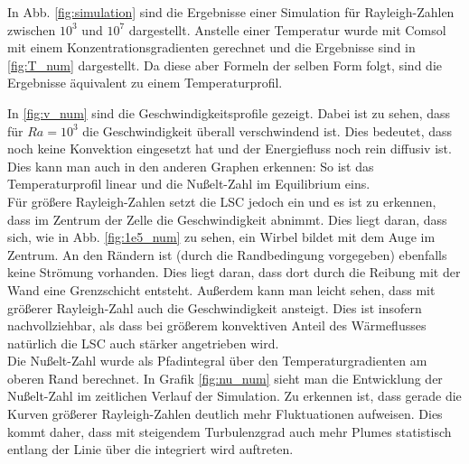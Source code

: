 \documentclass[12pt,a4paper,titlepage,headinclude]{scrartcl}
\numberwithin{equation}{subsection}
\begin{document}
In Abb. \ref{fig:simulation} sind die Ergebnisse einer Simulation für Rayleigh-Zahlen zwischen $10^3$ und $10^7$ dargestellt.
Anstelle einer Temperatur wurde mit Comsol mit einem Konzentrationsgradienten gerechnet und die Ergebnisse sind in \ref{fig:T_num} dargestellt.
Da diese aber Formeln der selben Form folgt, sind die Ergebnisse äquivalent zu einem Temperaturprofil.

In \ref{fig:v_num} sind die Geschwindigkeitsprofile gezeigt.
Dabei ist zu sehen, dass für $Ra=10^3$ die Geschwindigkeit überall verschwindend ist.
Dies bedeutet, dass noch keine Konvektion eingesetzt hat und der Energiefluss noch rein diffusiv ist.
Dies kann man auch in den anderen Graphen erkennen: So ist das Temperaturprofil linear und die Nußelt-Zahl im Equilibrium eins.\\

Für größere Rayleigh-Zahlen setzt die LSC jedoch ein und es ist zu erkennen, dass im Zentrum der Zelle die Geschwindigkeit abnimmt.
Dies liegt daran, dass sich, wie in Abb. \ref{fig:1e5_num} zu sehen, ein Wirbel bildet mit dem Auge im Zentrum.
An den Rändern ist (durch die Randbedingung vorgegeben) ebenfalls keine Strömung vorhanden.
Dies liegt daran, dass dort durch die Reibung mit der Wand eine Grenzschicht entsteht.
Außerdem kann man leicht sehen, dass mit größerer Rayleigh-Zahl auch die Geschwindigkeit ansteigt.
Dies ist insofern nachvollziehbar, als dass bei größerem konvektiven Anteil des Wärmeflusses natürlich die LSC auch stärker angetrieben wird.\\

Die Nußelt-Zahl wurde als Pfadintegral über den Temperaturgradienten am oberen Rand berechnet. 
In Grafik \ref{fig:nu_num} sieht man die Entwicklung der Nußelt-Zahl im zeitlichen Verlauf der Simulation.
Zu erkennen ist, dass gerade die Kurven größerer Rayleigh-Zahlen deutlich mehr Fluktuationen aufweisen.
Dies kommt daher, dass mit steigendem Turbulenzgrad auch mehr Plumes statistisch entlang der Linie über die integriert wird auftreten.
\end{document}
